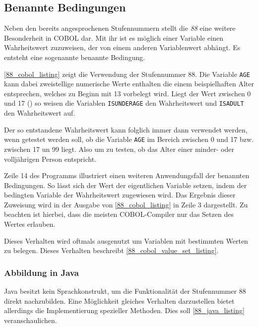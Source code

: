 \subsection{Benannte Bedingungen}
Neben den bereits angesprochenen Stufennummern stellt die \textit{88} eine weitere Besonderheit in COBOL dar. Mit ihr ist es möglich einer Variable einen Wahrheitswert zuzuweisen, der von einem anderen Variablenwert abhängt. Es entsteht eine sogenannte benannte Bedingung.

\autoref{88_cobol_listing} zeigt die Verwendung der Stufennummer 88. Die Variable \texttt{AGE} kann dabei zweistellige numerische Werte enthalten die einem beispielhaften Alter entsprechen, welches zu Beginn mit 13 vorbelegt wird. Liegt der Wert zwischen 0 und 17 () so weisen die Variablen \texttt{ISUNDERAGE} den Wahrheitswert  und \texttt{ISADULT} den Wahrheitswert  auf.

Der so entstandene Wahrheitswert kann folglich immer dann verwendet werden, wenn getestet werden soll, ob die Variable \texttt{AGE} im Bereich zwischen 0 und 17 bzw. zwischen 17 un 99 liegt. Also um zu testen, ob das Alter einer minder- oder volljährigen Person entspricht.

\sepCodeAndOutputCheck
{}
Zeile 14 des Programms illustriert einen weiteren Anwendungsfall der benannten Bedingungen. So lässt sich der Wert der eigentlichen Variable setzen, indem der bedingten Variable der Wahrheitswert  zugewiesen wird. Das Ergebnis dieser Zuweisung wird in der Ausgabe von \autoref{88_cobol_listing} in Zeile 3 dargestellt. Zu beachten ist hierbei, dass die meisten COBOL-Compiler nur das Setzen des Wertes  erlauben.

Dieses Verhalten wird oftmals ausgenutzt um Variablen mit bestimmten Werten zu belegen. Dieses Verhalten beschreibt \autoref{88_cobol_value_set_listing}.

\subsubsection*{Abbildung in Java}
Java besitzt kein Sprachkonstrukt, um die Funktionalität der Stufennummer 88 direkt nachzubilden. Eine Möglichkeit gleiches Verhalten darzustellen bietet allerdings die Implementierung spezieller Methoden. Dies soll \autoref{88_java_listing} veranschaulichen.

